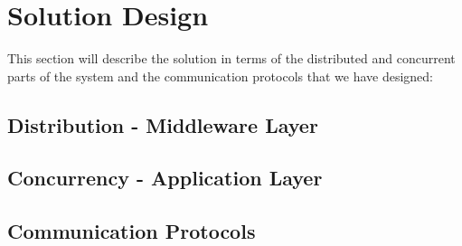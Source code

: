 \section{Solution Design}

This section will describe the solution in terms of the distributed and concurrent parts of the system and the communication protocols that we have designed:

\subsection{Distribution - Middleware Layer}

\subsection{Concurrency - Application Layer}

\subsection{Communication Protocols}

